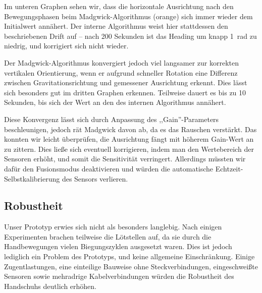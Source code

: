 Im unteren Graphen sehen wir, dass die horizontale Ausrichtung nach den
Bewegungsphasen beim Madgwick-Algorithmus (orange) sich immer wieder dem
Initialwert annähert. Der interne Algorithmus weist hier stattdessen den
beschriebenen Drift auf -- nach 200 Sekunden ist das Heading um knapp
\SI{1}{\radian} zu niedrig, und korrigiert sich nicht wieder.

Der Madgwick-Algorithmus konvergiert jedoch viel langsamer zur korrekten
vertikalen Orientierung, wenn er aufgrund schneller Rotation eine Differenz
zwischen Gravitationsrichtung und gemessener Ausrichtung erkennt.  Dies lässt
sich besonders gut im dritten Graphen erkennen. Teilweise dauert es bis zu 10
Sekunden, bis sich der Wert an den des internen Algorithmus annähert.

Diese Konvergenz lässt sich durch Anpassung des ,,Gain''-Parameters
beschleunigen, jedoch rät Madgwick davon ab, da es das Rauschen verstärkt.  Das
konnten wir leicht überprüfen, die Ausrichtung fängt mit höherem Gain-Wert an
zu zittern. Dies ließe sich eventuell korrigieren, indem man den Wertebereich
der Sensoren erhöht, und somit die Sensitivität verringert. Allerdings müssten
wir dafür den Fusionsmodus deaktivieren und würden die automatische
Echtzeit-Selbstkalibrierung des Sensors verlieren.

%

\subsection{Robustheit}

Unser Prototyp erwies sich nicht als besonders langlebig. Nach einigen
Experimenten brachen teilweise die Lötstellen auf, da sie durch die
Handbewegungen vielen Biegungszyklen ausgesetzt waren. Dies ist jedoch
lediglich ein Problem des Prototyps, und keine allgemeine Einschränkung. Einige
Zugentlastungen, eine einteilige Bauweise ohne Steckverbindungen,
eingeschweißte Sensoren sowie mehradrige Kabelverbindungen würden die
Robustheit des Handschuhs deutlich erhöhen.


